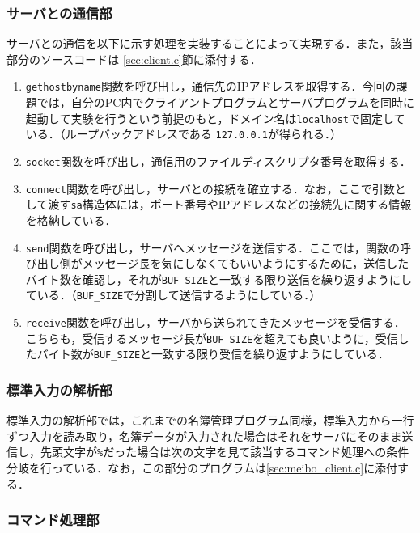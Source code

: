 \documentclass[11pt]{jsarticle}
\begin{document}
\subsubsection{サーバとの通信部}

サーバとの通信を以下に示す処理を実装することによって実現する．また，該当部分のソースコードは \ref{sec:client.c}節に添付する．

\begin{enumerate}
      \item {\tt gethostbyname}関数を呼び出し，通信先のIPアドレスを取得する．今回の課題では，自分のPC内でクライアントプログラムとサーバプログラムを同時に起動して実験を行うという前提のもと，ドメイン名は{\tt localhost}で固定している．（ループバックアドレスである {\tt 127.0.0.1}が得られる．）
      \item {\tt socket}関数を呼び出し，通信用のファイルディスクリプタ番号を取得する．
      \item {\tt connect}関数を呼び出し，サーバとの接続を確立する．なお，ここで引数として渡す{\tt sa}構造体には，ポート番号やIPアドレスなどの接続先に関する情報を格納している．
      \item {\tt send}関数を呼び出し，サーバへメッセージを送信する．ここでは，関数の呼び出し側がメッセージ長を気にしなくてもいいようにするために，送信したバイト数を確認し，それが{\tt BUF\_SIZE}と一致する限り送信を繰り返すようにしている．（{\tt BUF\_SIZE}で分割して送信するようにしている．）
      \item {\tt receive}関数を呼び出し，サーバから送られてきたメッセージを受信する．こちらも，受信するメッセージ長が{\tt BUF\_SIZE}を超えても良いように，受信したバイト数が{\tt BUF\_SIZE}と一致する限り受信を繰り返すようにしている．
\end{enumerate}

\subsubsection{標準入力の解析部}

標準入力の解析部では，これまでの名簿管理プログラム同様，標準入力から一行ずつ入力を読み取り，名簿データが入力された場合はそれをサーバにそのまま送信し，先頭文字が{\tt \%}だった場合は次の文字を見て該当するコマンド処理への条件分岐を行っている．なお，この部分のプログラムは\ref{sec:meibo_client.c}に添付する．

\subsubsection{コマンド処理部}
\end{document}
